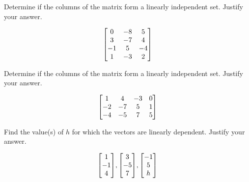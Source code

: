 \documentclass{../mathhomework}
\newenvironment{Mat}{\begin{bmatrix}}{\end{bmatrix}}
\begin{document}
\begin{problem}[1.7\#5]
    Determine if the columns of the matrix form a linearly independent set. Justify your answer.

    \begin{equation*}
        \begin{Mat}
            0 & -8 & 5 \\
            3 & -7 & 4 \\
            -1 & 5 & -4 \\
            1 & -3 & 2
        \end{Mat}
    \end{equation*}
\end{problem}

\begin{problem}[1.7\#7]
    Determine if the columns of the matrix form a linearly independent set. Justify your answer.

    \begin{equation*}
        \begin{Mat}
            1 & 4 & -3 & 0 \\
            -2 & -7 & 5 & 1 \\
            -4 & -5 & 7 & 5
        \end{Mat}
    \end{equation*}
\end{problem}

\begin{problem}[1.7\#11]
    Find the value(s) of $h$ for which the vectors are linearly dependent. Justify your answer.

    \begin{equation*}
        \begin{Mat}
            1 \\ -1 \\ 4
        \end{Mat},
        \begin{Mat}
            3 \\ -5 \\ 7
        \end{Mat},
        \begin{Mat}
            -1 \\ 5 \\ h
        \end{Mat}
    \end{equation*}
\end{problem}
\end{document}
